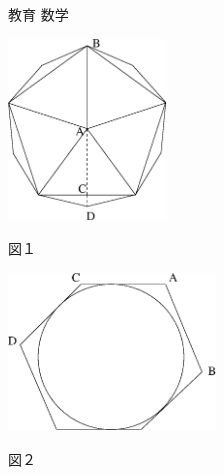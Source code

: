 \documentclass[fleqn]{jbook}
\begin{document}
\begin{question}{教育 数学}{}
\begin{subquestions}
\begin{subsubquestions}
\parbox[t]{80mm}{
\begin{center}
%
\includegraphics[clip,height=48mm,width=42mm]{1992math-1.eps}

図１
\end{center}
}\parbox[t]{80mm}{
\begin{center}
%
\includegraphics[clip,height=42mm,width=55mm]{1992math-2.eps}

図２
\end{center}
}
\end{subsubquestions}
\end{subquestions}
\end{question}
\end{document}
